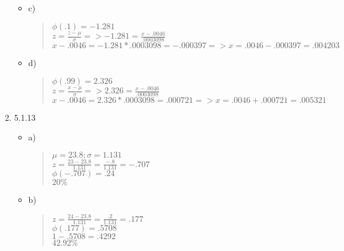 \documentclass{article}
\begin{document}
\begin{enumerate}
\begin{itemize}
        \end{itemize}
        \begin{itemize}
            \item c)
            \begin{quote}
                $\phi(.1) = -1.281$ \\
                $z = \frac{z-\mu}{\sigma} => -1.281 = \frac{x-.0046}{.0003098}$ \\
                $x-.0046 = -1.281*.0003098 = -.000397 => x=.0046-.000397 = .004203$
            \end{quote}
        \end{itemize}
        \begin{itemize}
            \item d)
            \begin{quote}
                $\phi(.99) = 2.326$ \\
                $z = \frac{x-\mu}{\sigma} => 2.326 = \frac{x-.0046}{.0003098}$ \\
                $x-.0046 = 2.326*.0003098 = .000721 => x = .0046+.000721 = .005321$
            \end{quote}
        \end{itemize}
    \item 5.1.13
        \begin{itemize}
            \item a)
            \begin{quote}
                $\mu = 23.8; \sigma = 1.131$ \\
                $z = \frac{23-23.8}{1.131} = \frac{-.8}{1.131} = -.707$ \\
                $\phi(-.707) = .24$ \\
                $20\%$
            \end{quote}
        \end{itemize}
        \begin{itemize}
            \item b)
            \begin{quote}
                $z = \frac{24-23.8}{1.131} = \frac{.2}{1.131} = .177$ \\
                $\phi(.177) = .5708$ \\
                $1-.5708 = .4292$ \\
                $42.92\%$
            \end{quote}
        \end{itemize}
        \begin{itemize}

\end{itemize}
\end{enumerate}
\end{document}
